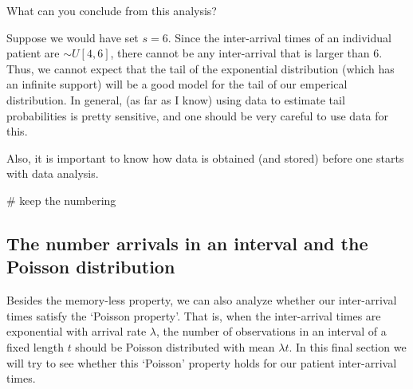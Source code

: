 \begin{exercise}
What can you conclude from this analysis?
  \begin{solution}
    Suppose we would have set $s=6$.
    Since the inter-arrival times of an individual patient are $\sim U[4, 6]$, there cannot be any inter-arrival that is larger than $6$.
    Thus, we cannot expect that the tail of the exponential distribution (which has an infinite support) will be a good model for the tail of our emperical distribution.
    In general, (as far as I know) using data to estimate tail probabilities is pretty sensitive, and one should be very careful to use data for this.

    Also, it is important to know how data is obtained (and stored) before one starts with data analysis.

\begin{pyverbatim}
# keep the numbering
\end{pyverbatim}
  \end{solution}
\end{exercise}


\subsection{The number arrivals in an interval and the Poisson distribution}

Besides the memory-less property, we can also analyze whether our inter-arrival times satisfy the `Poisson property'.
That is, when the inter-arrival times are exponential with arrival rate $\lambda$, the number of observations in an interval of a fixed length $t$ should be Poisson distributed with mean $\lambda t$.  In this final section we will try to see whether this `Poisson' property holds for our patient inter-arrival times.

